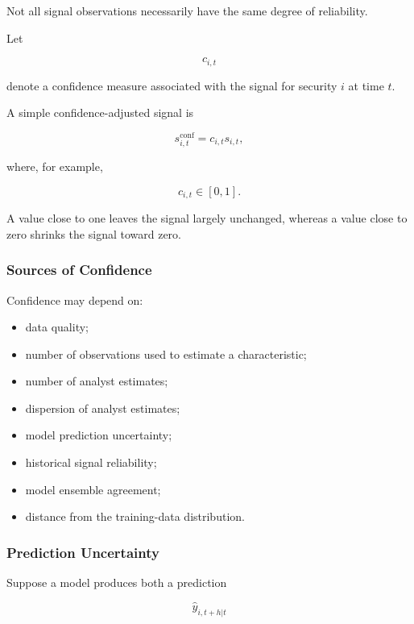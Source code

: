 \documentclass[11pt,a4paper]{article}
\begin{document}
Not all signal observations necessarily have the same degree of reliability.

Let

\begin{equation}
c_{i,t}
\end{equation}

denote a confidence measure associated with the signal for security $i$ at time
$t$.

A simple confidence-adjusted signal is

\begin{equation}
\boxed{
s_{i,t}^{\mathrm{conf}}
=
c_{i,t}
s_{i,t},
}
\end{equation}

where, for example,

\begin{equation}
c_{i,t}
\in[0,1].
\end{equation}

A value close to one leaves the signal largely unchanged, whereas a value close
to zero shrinks the signal toward zero.


\subsubsection{Sources of Confidence}

Confidence may depend on:

\begin{itemize}
    \item data quality;
    \item number of observations used to estimate a characteristic;
    \item number of analyst estimates;
    \item dispersion of analyst estimates;
    \item model prediction uncertainty;
    \item historical signal reliability;
    \item model ensemble agreement;
    \item distance from the training-data distribution.
\end{itemize}


\subsubsection{Prediction Uncertainty}

Suppose a model produces both a prediction

\begin{equation}
\widehat{y}_{i,t+h|t}
\end{equation}
\end{document}
